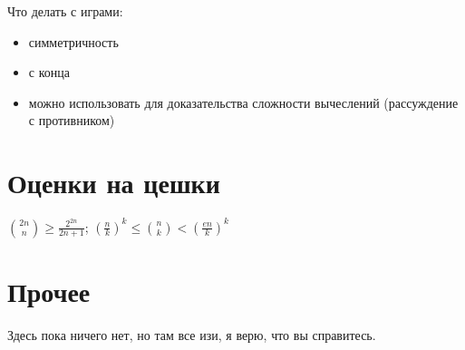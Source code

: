 \documentclass{article}
\renewcommand{\geq}{\geqslant}
\renewcommand{\leq}{\leqslant}
\begin{document}
Что делать с играми:
\begin{itemize}
    \item симметричность
    \item с конца
    \item можно использовать для доказательства сложности вычеслений (рассуждение с противником)
\end{itemize}

\section{Оценки на цешки}
$\binom{2n}{n} \geq \frac{2^{2n}}{2n + 1}$;
${\left(\frac{n}{k}\right)}^k \leq \binom{n}{k} < {\left(\frac{en}{k}\right)}^k$

\section{Прочее}
Здесь пока ничего нет, но там все изи, я верю, что вы справитесь.
\end{document}
